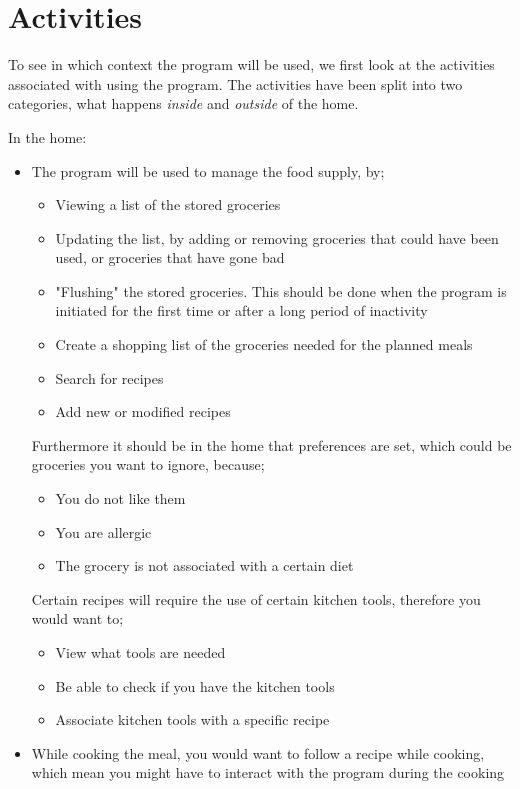 \section{Activities}
To see in which context the program will be used, we first look at the activities associated with using the program. The activities have been split into two categories, what happens \textit{inside} and \textit{outside} of the home.

In the home:
\begin{itemize}
\item The program will be used to manage the food supply, by;
	\begin{itemize}
		\item Viewing a list of the stored groceries
		\item Updating the list, by adding or removing groceries that could have been used, or groceries that have gone bad
		\item "Flushing" the stored groceries. This should be done when the program is initiated for the first time or after a long period of inactivity
		\item Create a shopping list of the groceries needed for the planned meals
		\item Search for recipes
		\item Add new or modified recipes
	\end{itemize}
	Furthermore it should be in the home that preferences are set, which could be groceries you want to ignore, because;
	\begin{itemize}
		\item You do not like them
		\item You are allergic
		\item The grocery is not associated with a certain diet
	\end{itemize}
	Certain recipes will require the use of certain kitchen tools, therefore you would want to;
	\begin{itemize}
		\item View what tools are needed
		\item Be able to check if you have the kitchen tools
		\item Associate kitchen tools with a specific recipe
	\end{itemize}
	\item While cooking the meal, you would want to follow a recipe while cooking, which mean you might have to interact with the program during the cooking
\end{itemize}

